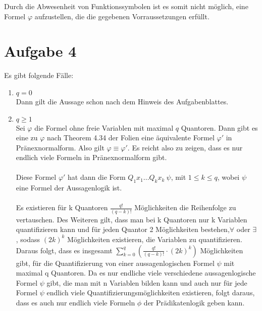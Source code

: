 \documentclass[a4paper,10pt]{article}
\begin{document}
\begin{enumerate}[(i)]
Durch die Abwesenheit von Funktionssymbolen ist es somit nicht möglich, eine Formel $\varphi$ aufzustellen, die die gegebenen Vorraussetzungen erfüllt.


\end{enumerate}

\section*{Aufgabe 4}
Es gibt folgende Fälle:
\begin{enumerate}
\item{$q = 0$}\\
Dann gilt die Aussage schon nach dem Hinweis des Aufgabenblattes.
\item{$q \ge 1$}\\
Sei $\varphi$ die Formel ohne freie Variablen mit maximal $q$ Quantoren. Dann gibt es eine zu $\varphi$ nach Theorem 4.34 der Folien eine äquivalente Formel $\varphi'$ in Pränexnormalform. Also gilt $\varphi \equiv \varphi'$. Es reicht also zu zeigen, dass es nur endlich viele Formeln in Pränexnormalform gibt.
\\\\
Diese Formel $\varphi'$ hat dann die Form $Q_1x_1...Q_kx_k\ \psi$, mit $1 \le k \le q$, wobei $\psi$ eine Formel der Aussagenlogik ist.
\\\\
Es existieren für k Quantoren $\frac{q!}{(q - k)!}$ Möglichkeiten die Reihenfolge zu vertauschen.  Des Weiteren gilt, dass man bei k Quantoren nur k Variablen quantifizieren kann und für jeden Quantor 2 Möglichkeiten bestehen,$\forall$ oder $\exists$, sodass $(2k)^k$ Möglichkeiten existieren, die Variablen zu quantifizieren. Daraus folgt, dass es insgesamt $\sum\limits_{k=0}^q (\frac{q!}{(q - k)!} \cdot (2k)^k)$ Möglichkeiten gibt, für die Quantifizierung von einer aussagenlogischen Formel $\psi$ mit maximal q Quantoren. Da es nur endliche viele verschiedene aussagenlogische Formel $\psi$ gibt, die man mit n Variablen bilden kann und auch nur für jede Formel $\psi$ endlich viele Quantifizierungsmöglichkeiten existieren, folgt daraus, dass es auch nur endlich viele Formeln $\phi$ der Prädikatenlogik geben kann.
\end{enumerate}
\end{document}
